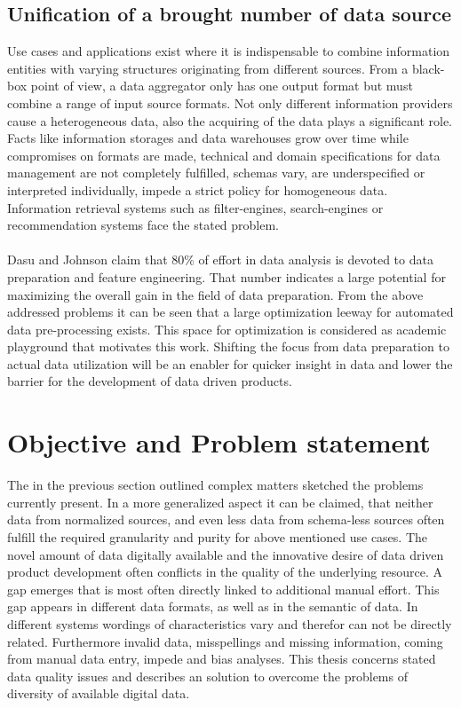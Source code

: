 \subsection{Unification of a brought number of data source} 

Use cases and applications exist where it is indispensable to combine information entities with varying structures originating from different sources. From a black-box point of view, a data aggregator only has one output format but must combine a range of input source formats. Not only different information providers cause a heterogeneous data, also the acquiring of the data plays a significant role. Facts like information storages and data warehouses grow over time while compromises on formats are made, technical and domain specifications for data management are not completely fulfilled, schemas vary, are underspecified or interpreted individually, impede a strict policy for homogeneous data. Information retrieval systems such as filter-engines, search-engines or recommendation systems face the stated problem. 
\\\\
Dasu and Johnson claim that 80\% of effort in data analysis is devoted to data preparation and feature engineering\cite{dasu_johnson_2003}. That number indicates a large potential for maximizing the overall gain in the field of data preparation. From the above addressed problems it can be seen that a large optimization leeway for automated data pre-processing exists. This space for optimization is considered as academic playground that motivates this work. Shifting the focus from data preparation to actual data utilization will be an enabler for quicker insight in data and lower the barrier for the development of data driven products.

\section{Objective and Problem statement\label{sec:objective}}
The in the previous section outlined complex matters sketched the problems currently present. In a more generalized aspect it can be claimed, that neither data from normalized sources, and even less data from schema-less sources often fulfill the required granularity and purity for above mentioned use cases. The novel amount of data digitally available and the innovative desire of data driven product development often conflicts in the quality of the underlying resource. A gap emerges that is most often directly linked to additional manual effort. This gap appears in different data formats, as well as in the semantic of data. In different systems wordings of characteristics vary and therefor can not be directly related. Furthermore invalid data, misspellings and missing information, coming from manual data entry, impede and bias analyses. This thesis concerns stated data quality issues and describes an solution to overcome the problems of diversity of available digital data.  

